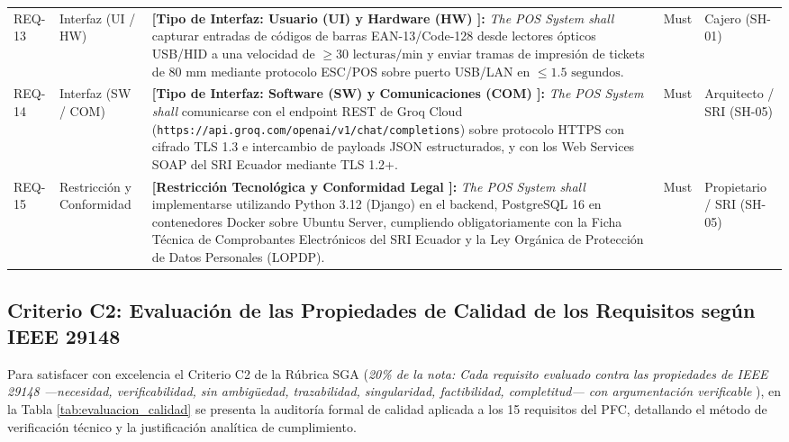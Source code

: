 \begin{table}[htbp]
\begin{tabularx}{\textwidth}{l l Y l l}
REQ-13 & Interfaz (UI / HW) & \textbf{[Tipo de Interfaz: Usuario (UI) y Hardware (HW) \cite{ieee29148}]:} \textit{The POS System shall} capturar entradas de códigos de barras EAN-13/Code-128 desde lectores ópticos USB/HID a una velocidad de $\ge 30\text{ lecturas/min}$ y enviar tramas de impresión de tickets de 80 mm mediante protocolo ESC/POS sobre puerto USB/LAN en $\le 1.5\text{ segundos}$. & Must & Cajero (SH-01) \\
REQ-14 & Interfaz (SW / COM) & \textbf{[Tipo de Interfaz: Software (SW) y Comunicaciones (COM) \cite{ieee29148}]:} \textit{The POS System shall} comunicarse con el endpoint REST de Groq Cloud (\texttt{https://api.groq.com/openai/v1/chat/completions}) sobre protocolo HTTPS con cifrado TLS 1.3 e intercambio de payloads JSON estructurados, y con los Web Services SOAP del SRI Ecuador mediante TLS 1.2+. & Must & Arquitecto / SRI (SH-05) \\
REQ-15 & Restricción y Conformidad & \textbf{[Restricción Tecnológica y Conformidad Legal \cite{ieee29148, pohl2025}]:} \textit{The POS System shall} implementarse utilizando Python 3.12 (Django) en el backend, PostgreSQL 16 en contenedores Docker sobre Ubuntu Server, cumpliendo obligatoriamente con la Ficha Técnica de Comprobantes Electrónicos del SRI Ecuador y la Ley Orgánica de Protección de Datos Personales (LOPDP). & Must & Propietario / SRI (SH-05) \\
\bottomrule
\end{tabularx}
\end{table}

\subsection{Criterio C2: Evaluación de las Propiedades de Calidad de los Requisitos según IEEE 29148}
Para satisfacer con excelencia el Criterio C2 de la Rúbrica SGA (\textit{20\% de la nota: Cada requisito evaluado contra las propiedades de IEEE 29148 —necesidad, verificabilidad, sin ambigüedad, trazabilidad, singularidad, factibilidad, completitud— con argumentación verificable} \cite{ieee29148}), en la Tabla \ref{tab:evaluacion_calidad} se presenta la auditoría formal de calidad aplicada a los 15 requisitos del PFC, detallando el método de verificación técnico y la justificación analítica de cumplimiento.

